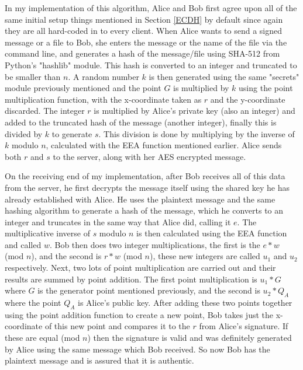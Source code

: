 \documentclass[12pt,a4paper]{article}
\begin{document}
In my implementation of this algorithm, Alice and Bob first agree upon all of the same initial setup things mentioned in Section \ref{ECDH} 
by default since again they are all hard-coded in to every client. 
When Alice wants to send a signed message or a file to Bob, she enters the message or the name of the file via the command line, 
and generates a hash of the message/file using SHA-512 from Python's "hashlib" module. 
This hash is converted to an integer and truncated to be smaller than $n$. 
A random number $k$ is then generated using the same "secrets" module previously mentioned and the point $G$ is multiplied by $k$ using 
the point multiplication function, with the x-coordinate taken as $r$ and the y-coordinate discarded. 
The integer $r$ is multiplied by Alice's private key (also an integer) and added to the truncated hash of the message (another integer), 
finally this is divided by $k$ to generate $s$. 
This division is done by multiplying by the inverse of $k$ modulo $n$, calculated with the EEA function mentioned earlier. 
Alice sends both $r$ and $s$ to the server, along with her AES encrypted message. 

On the receiving end of my implementation, after Bob receives all of this data from the server, 
he first decrypts the message itself using the shared key he has already established with Alice. 
He uses the plaintext message and the same hashing algorithm to generate a hash of the message, 
which he converts to an integer and truncates in the same way that Alice did, calling it $e$. 
The multiplicative inverse of $s$ modulo $n$ is then calculated using the EEA function and called $w$. 
Bob then does two integer multiplications, the first is the $e*w$ (mod $n$), 
and the second is $r*w$ (mod $n$), these new integers are called $u_1$ and $u_2$ respectively. 
Next, two lots of point multiplication are carried out and their results are summed by point addition. 
The first point multiplication is $u_1*G$ where $G$ is the generator point mentioned previously, 
and the second is $u_2*Q_A$ where the point $Q_A$ is Alice's public key. 
After adding these two points together using the point addition function to create a new point, 
Bob takes just the x-coordinate of this new point and compares it to the $r$ from Alice's signature. 
If these are equal (mod $n$) then the signature is valid and was definitely generated by Alice using the same message which Bob received. 
So now Bob has the plaintext message and is assured that it is authentic. 
\end{document}
